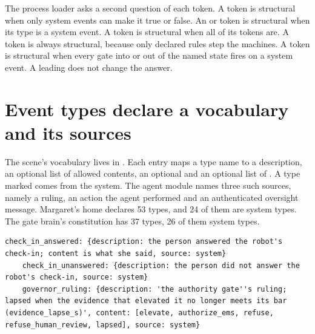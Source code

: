 The process loader asks a second question of each token. A token is structural when only system
events can make it true or false. An  or  token is structural when its type
is a system event. A  token is structural when all of its tokens are. A 
token is always structural, because only declared rules step the machines. A  token
is structural when every gate into or out of the named state fires on a system event. A leading
 does not change the answer.

\section{Event types declare a vocabulary and its sources}\label{sec:erisml-event-types}

The scene's vocabulary lives in . Each entry maps a type name to a
description, an optional list of allowed contents, an optional  and an optional list of
. A type marked  comes from the system. The agent module names
three such sources, namely a ruling, an action the agent performed and an authenticated oversight
message. Margaret's home declares 53 types, and 24 of them are system types. The gate brain's
constitution has 37 types, 26 of them system types.

\begin{lstlisting}[caption={Three event types from the system (lines 1342 to 1344)}, label={lst:scene-system-types}]
    check_in_answered: {description: the person answered the robot's check-in; content is what she said, source: system}
    check_in_unanswered: {description: the person did not answer the robot's check-in, source: system}
    governor_ruling: {description: 'the authority gate''s ruling; lapsed when the evidence that elevated it no longer meets its bar (evidence_lapse_s)', content: [elevate, authorize_ems, refuse, refuse_human_review, lapsed], source: system}
\end{lstlisting}

